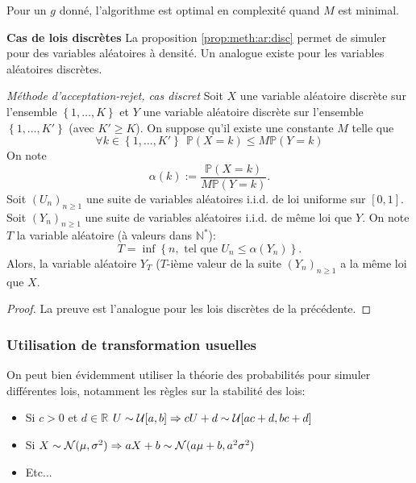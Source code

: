 Pour un $g$ donné, l'algorithme est optimal en complexité quand $M$ est minimal.

\vspace{\baselineskip}
\textbf{Cas de lois discrètes} La proposition \ref{prop:meth:ar:disc} permet de simuler pour des variables aléatoires à densité. Un analogue existe pour les variables aléatoires discrètes.

\begin{propriete}{\textit{Méthode d'acceptation-rejet, cas discret}}\label{prop:meth:ar:disc}
Soit $X$ une variable aléatoire discrète sur l'ensemble $\left\lbrace 1,\dots, K\right\rbrace$ et $Y$ une variable aléatoire discrète sur l'ensemble $\left\lbrace 1,\dots, K'\right\rbrace$ (avec $K' \geq K$).
On suppose qu'il existe une constante $M$ telle que 
$$\forall k \in \left\lbrace 1,\dots, K'\right\rbrace~~\mathbb{P}(X = k) \leq M\mathbb{P}(Y=k)$$
On note 
$$\alpha(k) := \frac{\mathbb{P}(X = k)}{M\mathbb{P}(Y=k)}.$$
Soit $(U_n)_{n\geq 1}$ une suite de variables aléatoires i.i.d. de loi uniforme sur $[0, 1]$. Soit $(Y_n)_{n\geq 1}$ une suite de variables aléatoires i.i.d. de même loi que $Y$.
On note $T$ la variable aléatoire (à valeurs dans $\mathbb{N}^*$):
$$T = \inf\left\lbrace n, \text{ tel que } U_n \leq \alpha(Y_n)\right\rbrace.$$
Alors, la variable aléatoire $Y_T$ ($T$-ième valeur de la suite  $(Y_n)_{n\geq 1}$ a la même loi que $X$.
\end{propriete}

\begin{proof}
La preuve est l'analogue pour les lois discrètes de la précédente.
\end{proof}

\subsubsection{Utilisation de transformation usuelles}

On peut bien évidemment utiliser la théorie des probabilités pour simuler différentes lois, notamment les règles sur la stabilité des lois:

\begin{itemize}
\item Si $c > 0$ et $d\in\mathbb{R}$ $U \sim \mathcal{U}[a, b] \Rightarrow cU + d \sim \mathcal{U}[ac + d, bc + d]$
\item Si $X\sim\mathcal{N} (\mu, \sigma^2) \Rightarrow aX +b \sim \mathcal{N}(a\mu + b, a^2\sigma^2)$
\item Etc...
\end{itemize}

